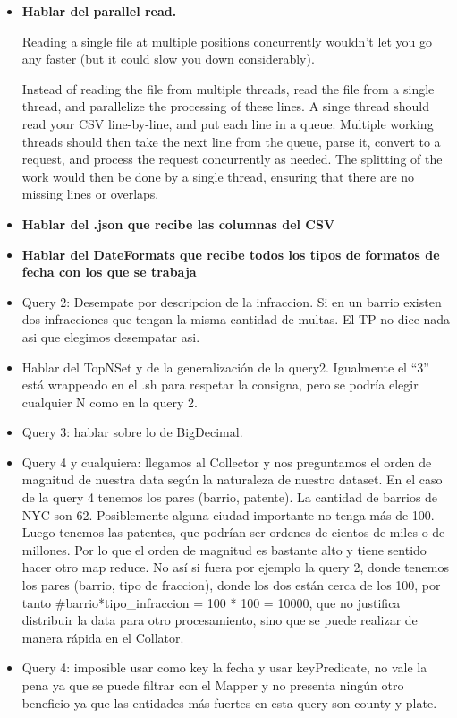 \documentclass[a4paper,12pt]{article}
\begin{document}
	\begin{itemize}
		\item \textbf{Hablar del parallel read.}
		
		Reading a single file at multiple positions concurrently wouldn't let you go any faster (but it could slow you down considerably).
		
		Instead of reading the file from multiple threads, read the file from a single thread, and parallelize the processing of these lines. A singe thread should read your CSV line-by-line, and put each line in a queue. Multiple working threads should then take the next line from the queue, parse it, convert to a request, and process the request concurrently as needed. The splitting of the work would then be done by a single thread, ensuring that there are no missing lines or overlaps. 
		
		\item \textbf{Hablar del .json que recibe las columnas del CSV}
		
		\item \textbf{Hablar del DateFormats que recibe todos los tipos de formatos de fecha con los que se trabaja}
		
		\item Query 2: Desempate por descripcion de la infraccion. Si en un barrio existen dos infracciones que tengan la misma cantidad de multas. El TP no dice nada asi que elegimos desempatar asi. 
		
		\item Hablar del TopNSet y de la generalización de la query2. Igualmente el ``3'' está wrappeado en el .sh para respetar la consigna, pero se podría elegir cualquier N como en la query 2.
		
		\item Query 3: hablar sobre lo de BigDecimal.
		
		\item Query 4 y cualquiera: llegamos al Collector y nos preguntamos el orden de magnitud de nuestra data según la naturaleza de nuestro dataset. En el caso de la query 4 tenemos los pares (barrio, patente). La cantidad de barrios de NYC son 62. Posiblemente alguna ciudad importante no tenga más de 100. Luego tenemos las patentes, que podrían ser ordenes de cientos de miles o de millones. Por lo que el orden de magnitud es bastante alto y tiene sentido hacer otro map reduce. No así si fuera por ejemplo la query 2, donde tenemos los pares (barrio, tipo de fraccion), donde los dos están cerca de los 100, por tanto \#barrio*tipo\_infraccion = 100 * 100 = 10000, que no justifica distribuir la data para otro procesamiento, sino que se puede realizar de manera rápida en el Collator.
		
		\item Query 4: imposible usar como key la fecha y usar keyPredicate, no vale la pena ya que se puede filtrar con el Mapper y no presenta ningún otro beneficio ya que las entidades más fuertes en esta query son county y plate.
	\end{itemize}
	
	
\end{document}
